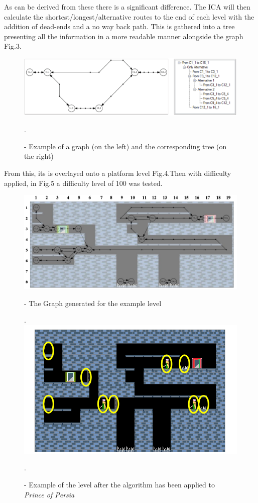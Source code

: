 \documentclass{scrartcl}
\begin{document}
As can be derived from these there is a significant difference. The ICA will then calculate the shortest/longest/alternative routes to the end of each level with the addition of dead-ends and a no way back path. This is gathered into a tree presenting all the information in a more readable manner alongside the graph Fig.3\cite{fausto}.
\newline
\newline
\newline
\begin{figure}[h]
	\centering
	\includegraphics[width=0.7\linewidth]{Fig3}
	\caption{ - Example of a graph (on the left) and the corresponding tree (on the right)}.
	\label{Fig3}
\end{figure}\cite{fausto}


From this, its is overlayed onto a platform level Fig.4.Then with difficulty applied, in Fig.5 a difficulty level of 100 was tested\cite{fausto}.
\newline
\newline
\newline
\begin{figure}[h]
	\centering
	\includegraphics[width=0.7\linewidth]{Fig4}
	\caption{ - The Graph generated for the example level}.
	\label{Fig4}
	\centering
	\includegraphics[width=0.7\linewidth]{Fig5}
	\caption{ - Example of the level after the algorithm has been applied to \textit{Prince of Persia}}.
	\label{Fig5}
\end{figure}\cite{fausto}
\end{document}
